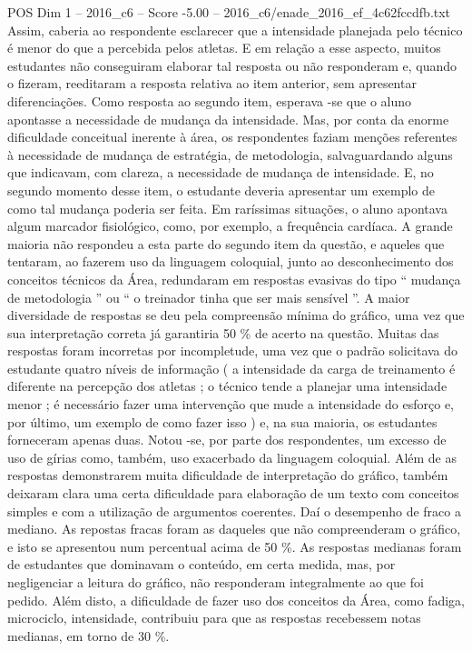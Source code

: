 \begin{textsample}{POS Dim 1 – 2016\_c6 – Score -5.00 – 2016\_c6/enade\_2016\_ef\_4c62fccdfb.txt}
Assim, caberia ao respondente esclarecer que a intensidade planejada pelo técnico é menor do que a percebida pelos atletas.
E em relação a esse aspecto, muitos estudantes não conseguiram elaborar tal resposta ou não responderam e, quando o fizeram, reeditaram a resposta relativa ao item anterior, sem apresentar diferenciações.
Como resposta ao segundo item, esperava -se que o aluno apontasse a necessidade de mudança da intensidade.
Mas, por conta da enorme dificuldade conceitual inerente à área, os respondentes faziam menções referentes à necessidade de mudança de estratégia, de metodologia, salvaguardando alguns que indicavam, com clareza, a necessidade de mudança de intensidade.
E, no segundo momento desse item, o estudante deveria apresentar um exemplo de como tal mudança poderia ser feita.
Em raríssimas situações, o aluno apontava algum marcador fisiológico, como, por exemplo, a frequência cardíaca.
A grande maioria não respondeu a esta parte do segundo item da questão, e aqueles que tentaram, ao fazerem uso da linguagem coloquial, junto ao desconhecimento dos conceitos técnicos da Área, redundaram em respostas evasivas do tipo “ mudança de metodologia ” ou “ o treinador tinha que ser mais sensível ”.
A maior diversidade de respostas se deu pela compreensão mínima do gráfico, uma vez que sua interpretação correta já garantiria 50 \% de acerto na questão.
Muitas das respostas foram incorretas por incompletude, uma vez que o padrão solicitava do estudante quatro níveis de informação ( a intensidade da carga de treinamento é diferente na percepção dos atletas ; o técnico tende a planejar uma intensidade menor ; é necessário fazer uma intervenção que mude a intensidade do esforço e, por último, um exemplo de como fazer isso ) e, na sua maioria, os estudantes forneceram apenas duas.
Notou -se, por parte dos respondentes, um excesso de uso de gírias como, também, uso exacerbado da linguagem coloquial.
Além de as respostas demonstrarem muita dificuldade de interpretação do gráfico, também deixaram clara uma certa dificuldade para elaboração de um texto com conceitos simples e com a utilização de argumentos coerentes.
Daí o desempenho de fraco a mediano.
As repostas fracas foram as daqueles que não compreenderam o gráfico, e isto se apresentou num percentual acima de 50 \%.
As respostas medianas foram de estudantes que dominavam o conteúdo, em certa medida, mas, por negligenciar a leitura do gráfico, não responderam integralmente ao que foi pedido.
Além disto, a dificuldade de fazer uso dos conceitos da Área, como fadiga, microciclo, intensidade, contribuiu para que as respostas recebessem notas medianas, em torno de 30 \%.

\end{textsample}
